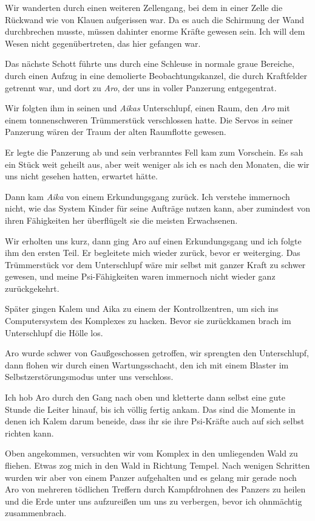 \documentclass[11pt]{scrartcl}
\begin{document}
Wir wanderten durch einen weiteren Zellengang, bei dem in einer Zelle
die Rückwand wie von Klauen aufgerissen war. Da es auch die Schirmung
der Wand durchbrechen musste, müssen dahinter enorme Kräfte gewesen
sein. Ich will dem Wesen nicht gegenübertreten, das hier gefangen war.

Das nächste Schott führte uns durch eine Schleuse in normale graue
Bereiche, durch einen Aufzug in eine demolierte Beobachtungskanzel, die
durch Kraftfelder getrennt war, und dort zu \emph{Aro}, der uns in
voller Panzerung entgegentrat.

Wir folgten ihm in seinen und \emph{Aikas} Unterschlupf, einen Raum, den
\emph{Aro} mit einem tonnenschweren Trümmerstück verschlossen hatte. Die
Servos in seiner Panzerung wären der Traum der alten Raumflotte gewesen.

Er legte die Panzerung ab und sein verbranntes Fell kam zum Vorschein.
Es sah ein Stück weit geheilt aus, aber weit weniger als ich es nach den
Monaten, die wir uns nicht gesehen hatten, erwartet hätte.

Dann kam \emph{Aika} von einem Erkundungsgang zurück. Ich verstehe
immernoch nicht, wie das System Kinder für seine Aufträge nutzen kann,
aber zumindest von ihren Fähigkeiten her überflügelt sie die meisten
Erwachsenen.

Wir erholten uns kurz, dann ging Aro auf einen Erkundungsgang und ich
folgte ihm den ersten Teil. Er begleitete mich wieder zurück, bevor er
weiterging. Das Trümmerstück vor dem Unterschlupf wäre mir selbst mit
ganzer Kraft zu schwer gewesen, und meine Psi-Fähigkeiten waren
immernoch nicht wieder ganz zurückgekehrt.

Später gingen Kalem und Aika zu einem der Kontrollzentren, um sich ins
Computersystem des Komplexes zu hacken. Bevor sie zurückkamen brach im
Unterschlupf die Hölle los.

Aro wurde schwer von Gaußgeschossen getroffen, wir sprengten den
Unterschlupf, dann flohen wir durch einen Wartungsschacht, den ich mit
einem Blaster im Selbstzerstörungsmodus unter uns verschloss.

Ich hob Aro durch den Gang nach oben und kletterte dann selbst eine gute
Stunde die Leiter hinauf, bis ich völlig fertig ankam. Das sind die
Momente in denen ich Kalem darum beneide, dass ihr sie ihre Psi-Kräfte
auch auf sich selbst richten kann.

Oben angekommen, versuchten wir vom Komplex in den umliegenden Wald zu
fliehen. Etwas zog mich in den Wald in Richtung Tempel. Nach wenigen
Schritten wurden wir aber von einem Panzer aufgehalten und es gelang mir
gerade noch Aro von mehreren tödlichen Treffern durch Kampfdrohnen des
Panzers zu heilen und die Erde unter uns aufzureißen um uns zu
verbergen, bevor ich ohnmächtig zusammenbrach.
\end{document}
